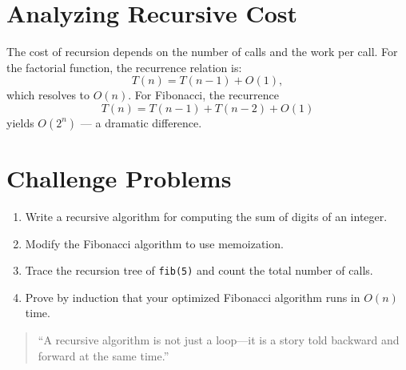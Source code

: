 \section{Analyzing Recursive Cost}

The cost of recursion depends on the number of calls and the work per call.
For the factorial function, the recurrence relation is:
\[
T(n) = T(n-1) + O(1),
\]
which resolves to $O(n)$.
For Fibonacci, the recurrence
\[
T(n) = T(n-1) + T(n-2) + O(1)
\]
yields $O(2^n)$ — a dramatic difference.

\section{Challenge Problems}

\begin{enumerate}
  \item Write a recursive algorithm for computing the sum of digits of an integer.
  \item Modify the Fibonacci algorithm to use memoization.  
  \item Trace the recursion tree of \texttt{fib(5)} and count the total number of calls.
  \item Prove by induction that your optimized Fibonacci algorithm runs in $O(n)$ time.
\end{enumerate}

\begin{quote}
``A recursive algorithm is not just a loop—it is a story told backward and forward at the same time.''
\end{quote}


